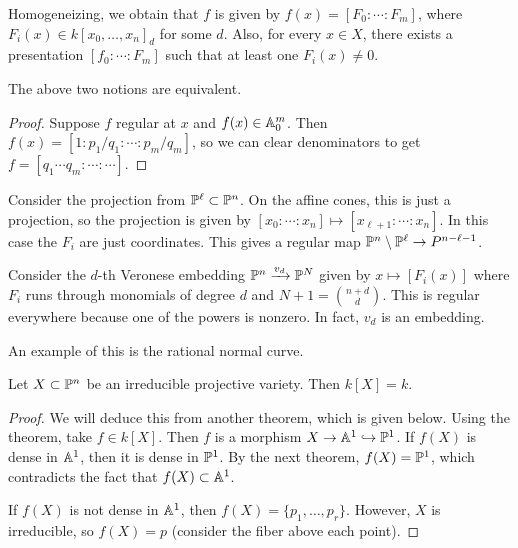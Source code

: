 \documentclass[twoside, 10pt]{article}
\begin{document}
    Homogeneizing, we obtain that $f$ is given by $f(x) = [F_0:\cdots:F_m]$,
    where $F_i(x) \in k[x_0, \ldots, x_n]_d$ for some $d$. Also, for every $x
    \in X$, there exists a presentation $[f_0:\cdots:F_m]$ such that at least
    one $F_i(x) \neq 0$.

    \begin{prop} The above two notions are equivalent.  \begin{proof} Suppose
    $f$ regular at $x$ and $f(x) \in \A^m_0$. Then $f(x) =
[1:p_1/q_1:\cdots:p_m/q_m]$, so we can clear denominators to get $f =
[q_1\cdots q_m:\cdots:\cdots]$.  \end{proof} \end{prop}

    \begin{exm} Consider the projection from $\P^{\ell} \subset \P^n$. On the
        affine cones, this is just a projection, so the projection is given by
        $[x_0:\cdots:x_n] \mapsto [x_{\ell+1}:\cdots:x_n]$. In this case the
        $F_i$ are just coordinates. This gives a regular map $\P^n \setminus
    \P^{\ell} \to P^{n-\ell - 1}$.  \end{exm}
    
    \begin{exm} Consider the $d$-th Veronese embedding $\P^n \xrightarrow{v_d}
        \P^N$ given by $x \mapsto [F_i(x)]$ where $F_i$ runs through monomials
        of degree $d$ and $N+1 = \binom{n+d}{d}$. This is regular everywhere
        because one of the powers is nonzero. In fact, $v_d$ is an embedding.

        An example of this is the rational normal curve.  \end{exm}

    \begin{thm} Let $X \subset \P^n$ be an irreducible projective variety. Then
        $k[X] = k$.  \begin{proof} We will deduce this from another theorem,
            which is given below.  Using the theorem, take $f \in k[X]$. Then
            $f$ is a morphism $X \to \A^1 \hookrightarrow \P^1$. If $f(X)$ is
            dense in $\A^1$, then it is dense in $\P^1$. By the next theorem,
            $f(X) = \P^1$, which contradicts the fact that $f(X) \subset \A^1$. 

            If $f(X)$ is not dense in $\A^1$, then $f(X) = \{p_1, \ldots,
        p_r\}$. However, $X$ is irreducible, so $f(X) = p$ (consider the fiber
    above each point).  \end{proof} \end{thm}
\end{document}

